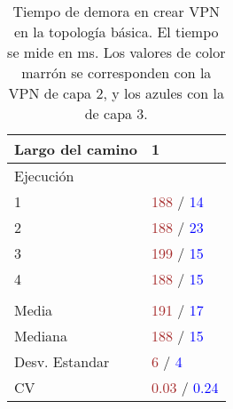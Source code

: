 \newcommand{\vpncd}{\textcolor{blue}[1]}

\newcommand{\vpnct}{\textcolor{green}[1]}

\begin{table}[ht]
	\caption{Tiempo de demora en crear VPN en la topología básica. El tiempo se mide en ms. Los valores de color marrón se corresponden con la VPN de capa 2, y los azules con la de capa 3.}
	\centering 
	\begin{tabular}{p{3.2cm} p{1.8cm}}
		\hline
		Largo del camino & 1 \\ [0.5ex]
		\hline
		Ejecución & \\
		1 & \textcolor{brown}{188} / \textcolor{blue}{14} \\
		2 & \textcolor{brown}{188} / \textcolor{blue}{23} \\
		3 & \textcolor{brown}{199} / \textcolor{blue}{15} \\
		4 & \textcolor{brown}{188} / \textcolor{blue}{15} \\
		& \\
		Media & \textcolor{brown}{191} / \textcolor{blue}{17} \\
		Mediana & \textcolor{brown}{188} / \textcolor{blue}{15} \\
		Desv. Estandar & \textcolor{brown}{6} / \textcolor{blue}{4} \\
		CV & \textcolor{brown}{0.03} / \textcolor{blue}{0.24} \\ [1ex]
		\hline
	\end{tabular}
	\label{table:tiempo_topo_basica}
\end{table}

